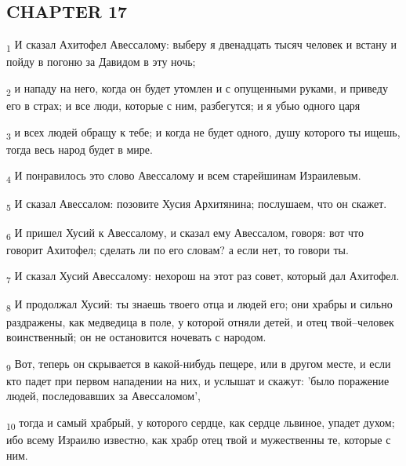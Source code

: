 \subsection{CHAPTER 17}
\begin{tcolorbox}
\textsubscript{1} И сказал Ахитофел Авессалому: выберу я двенадцать тысяч человек и встану и пойду в погоню за Давидом в эту ночь;
\end{tcolorbox}
\begin{tcolorbox}
\textsubscript{2} и нападу на него, когда он будет утомлен и с опущенными руками, и приведу его в страх; и все люди, которые с ним, разбегутся; и я убью одного царя
\end{tcolorbox}
\begin{tcolorbox}
\textsubscript{3} и всех людей обращу к тебе; и когда не будет одного, душу которого ты ищешь, тогда весь народ будет в мире.
\end{tcolorbox}
\begin{tcolorbox}
\textsubscript{4} И понравилось это слово Авессалому и всем старейшинам Израилевым.
\end{tcolorbox}
\begin{tcolorbox}
\textsubscript{5} И сказал Авессалом: позовите Хусия Архитянина; послушаем, что он скажет.
\end{tcolorbox}
\begin{tcolorbox}
\textsubscript{6} И пришел Хусий к Авессалому, и сказал ему Авессалом, говоря: вот что говорит Ахитофел; сделать ли по его словам? а если нет, то говори ты.
\end{tcolorbox}
\begin{tcolorbox}
\textsubscript{7} И сказал Хусий Авессалому: нехорош на этот раз совет, который дал Ахитофел.
\end{tcolorbox}
\begin{tcolorbox}
\textsubscript{8} И продолжал Хусий: ты знаешь твоего отца и людей его; они храбры и сильно раздражены, как медведица в поле, у которой отняли детей, и отец твой--человек воинственный; он не остановится ночевать с народом.
\end{tcolorbox}
\begin{tcolorbox}
\textsubscript{9} Вот, теперь он скрывается в какой-нибудь пещере, или в другом месте, и если кто падет при первом нападении на них, и услышат и скажут: 'было поражение людей, последовавших за Авессаломом',
\end{tcolorbox}
\begin{tcolorbox}
\textsubscript{10} тогда и самый храбрый, у которого сердце, как сердце львиное, упадет духом; ибо всему Израилю известно, как храбр отец твой и мужественны те, которые с ним.
\end{tcolorbox}
